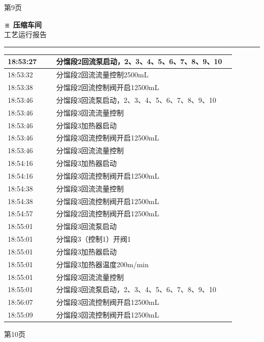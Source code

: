 \documentclass[UTF8,10pt,a4paper,fontset=fandol]{ctexart}
\begin{document}
\begin{center}
\begin{minipage}[t]{0.47\linewidth}
\vfill
第9页
\end{minipage}
\hfill
\begin{minipage}[t]{0.47\linewidth}
\centering
\textbf{※ 压缩车间}\\[-1mm]
工艺运行报告

\vspace{1mm}
\hrule
\vspace{1mm}

\scriptsize
\begin{tabular}{|p{0.19\linewidth}|p{0.70\linewidth}|}
\hline
18:53:27 & 分馏段2回流泵启动，2、3、4、5、6、7、8、9、10 \\ \hline
18:53:32 & 分馏段2回流流量控制2500mL \\ \hline
18:53:38 & 分馏段2回流控制阀开启12500mL \\ \hline
18:53:46 & 分馏段3回流泵启动，2、3、4、5、6、7、8、9、10 \\ \hline
18:53:46 & 分馏段3回流流量控制 \\ \hline
18:53:46 & 分馏段3加热器启动 \\ \hline
18:53:46 & 分馏段3回流控制阀开启12500mL \\ \hline
18:53:46 & 分馏段3回流流量控制 \\ \hline
18:54:16 & 分馏段3加热器启动 \\ \hline
18:54:16 & 分馏段3回流控制阀开启12500mL \\ \hline
18:54:38 & 分馏段3回流流量控制 \\ \hline
18:54:38 & 分馏段3回流控制阀开启12500mL \\ \hline
18:54:57 & 分馏段2回流控制阀开启12500mL \\ \hline
18:55:01 & 分馏段3回流泵启动 \\ \hline
18:55:01 & 分馏段3（控制1）开阀1 \\ \hline
18:55:01 & 分馏段3加热器启动 \\ \hline
18:55:01 & 分馏段3加热器温度200m/min \\ \hline
18:55:01 & 分馏段3回流流量控制 \\ \hline
18:55:01 & 分馏段3回流泵启动，2、3、4、5、6、7、8、9、10 \\ \hline
18:56:07 & 分馏段3回流控制阀开启12500mL \\ \hline
18:55:09 & 分馏段3回流控制阀开启12500mL \\ \hline
\end{tabular}

\vfill
第10页
\end{minipage}
\end{center}
\end{document}
